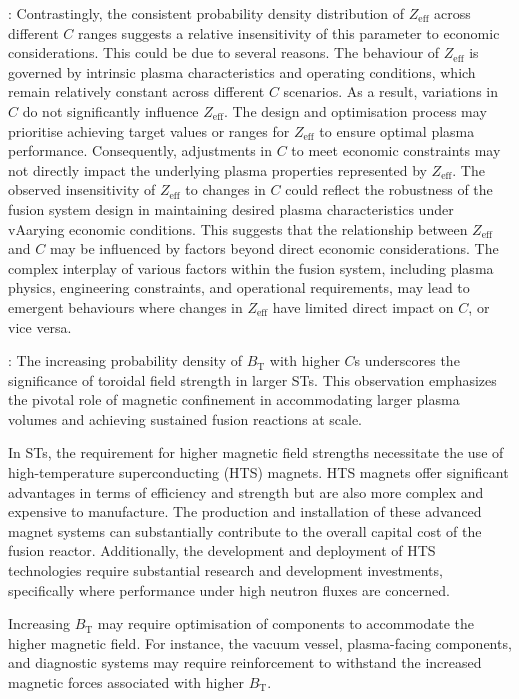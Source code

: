 \documentclass[journal]{IEEEtran}
\begin{document}
: Contrastingly, the consistent probability density distribution of $Z_{\text{eff}}$ across different $C$ ranges suggests a relative insensitivity of this parameter to economic considerations. This could be due to several reasons. The behaviour of $Z_{\text{eff}}$ is governed by intrinsic plasma characteristics and operating conditions, which remain relatively constant across different $C$ scenarios. As a result, variations in $C$ do not significantly influence $Z_{\text{eff}}$. The design and optimisation process may prioritise achieving target values or ranges for $Z_{\text{eff}}$ to ensure optimal plasma performance. Consequently, adjustments in $C$ to meet economic constraints may not directly impact the underlying plasma properties represented by $Z_{\text{eff}}$. The observed insensitivity of $Z_{\text{eff}}$ to changes in $C$ could reflect the robustness of the fusion system design in maintaining desired plasma characteristics under vAarying economic conditions. This suggests that the relationship between $Z_{\text{eff}}$ and $C$ may be influenced by factors beyond direct economic considerations. The complex interplay of various factors within the fusion system, including plasma physics, engineering constraints, and operational requirements, may lead to emergent behaviours where changes in $Z_{\text{eff}}$ have limited direct impact on $C$, or vice versa.

: The increasing probability density of $B_{\text{T}}$ with higher $C$s underscores the significance of toroidal field strength in larger STs. This observation emphasizes the pivotal role of magnetic confinement in accommodating larger plasma volumes and achieving sustained fusion reactions at scale. 

In STs, the requirement for higher magnetic field strengths necessitate the use of high-temperature superconducting (HTS) magnets. HTS magnets offer significant advantages in terms of efficiency and strength but are also more complex and expensive to manufacture. The production and installation of these advanced magnet systems can substantially contribute to the overall capital cost of the fusion reactor. Additionally, the development and deployment of HTS technologies require substantial research and development investments, specifically where performance under high neutron fluxes are concerned. 

Increasing $B_{\text{T}}$ may require optimisation of components to accommodate the higher magnetic field. For instance, the vacuum vessel, plasma-facing components, and diagnostic systems may require reinforcement to withstand the increased magnetic forces associated with higher $B_{\text{T}}$. 
\end{document}
